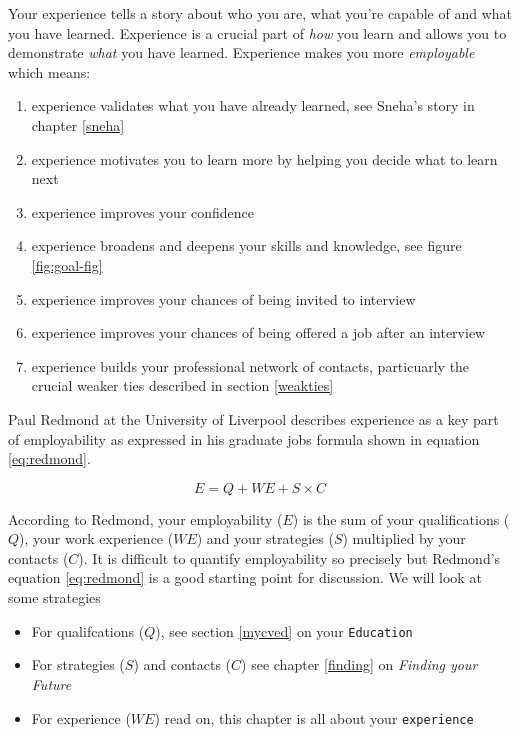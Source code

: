 \documentclass[
]{book}
\providecommand{\tightlist}{%
  \setlength{\itemsep}{0pt}\setlength{\parskip}{0pt}}
\begin{document}
Your experience tells a story about who you are, what you're capable of and what you have learned. Experience is a crucial part of \emph{how} you learn and allows you to demonstrate \emph{what} you have learned. Experience makes you more \emph{employable} which means:

\begin{enumerate}
\def\labelenumi{\arabic{enumi}.}
\tightlist
\item
  experience validates what you have already learned, see Sneha's story in chapter \ref{sneha}
\item
  experience motivates you to learn more by helping you decide what to learn next
\item
  experience improves your confidence \citep{jackiecarter}
\item
  experience broadens and deepens your skills and knowledge, see figure \ref{fig:goal-fig}
\item
  experience improves your chances of being invited to interview
\item
  experience improves your chances of being offered a job after an interview
\item
  experience builds your professional network of contacts, particuarly the crucial weaker ties described in section \ref{weakties}
\end{enumerate}

Paul Redmond at the University of Liverpool describes experience as a key part of employability \citep{paulredmond} as expressed in his graduate jobs formula shown in equation \eqref{eq:redmond}.

\begin{equation}
  E = Q + WE + S \times C
  \label{eq:redmond}
\end{equation}

According to Redmond, your employability (\(E\)) is the sum of your qualifications (\(Q\)), your work experience (\(WE\)) and your strategies (\(S\)) multiplied by your contacts (\(C\)). It is difficult to quantify employability so precisely but Redmond's equation \eqref{eq:redmond} is a good starting point for discussion. We will look at some strategies

\begin{itemize}
\tightlist
\item
  For qualifcations (\(Q\)), see section \ref{mycved} on your \texttt{Education}
\item
  For strategies (\(S\)) and contacts (\(C\)) see chapter \ref{finding} on \emph{Finding your Future}
\item
  For experience (\(WE\)) read on, this chapter is all about your \texttt{experience}
\end{itemize}
\end{document}
